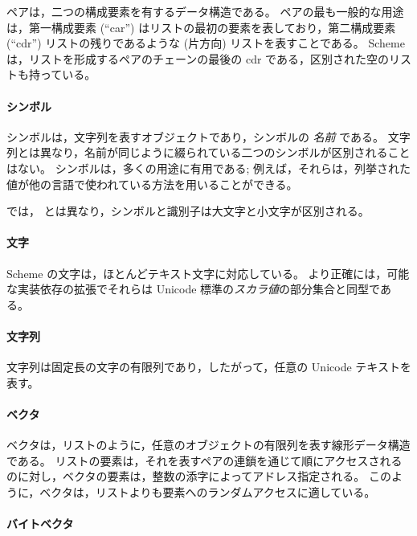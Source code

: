ペアは，二つの構成要素を有するデータ構造である。
ペアの最も一般的な用途は，第一構成要素 (``car'') はリストの最初の要素を表しており，第二構成要素 (``cdr'') リストの残りであるような (片方向) リストを表すことである。
Scheme は，リストを形成するペアのチェーンの最後の cdr である，区別された空のリストも持っている。

\paragraph{シンボル}

シンボルは，文字列を表すオブジェクトであり，シンボルの \textit{名前} である。
文字列とは異なり，名前が同じように綴られている二つのシンボルが区別されることはない。
シンボルは，多くの用途に有用である; 例えば，それらは，列挙された値が他の言語で使われている方法を用いることができる。

\rsevenrs では， \rfivers とは異なり，シンボルと識別子は大文字と小文字が区別される。

\paragraph{文字}

Scheme の文字は，ほとんどテキスト文字に対応している。
より正確には，可能な実装依存の拡張でそれらは Unicode 標準の\textit{スカラ値}の部分集合と同型である。

\paragraph{文字列}

文字列は固定長の文字の有限列であり，したがって，任意の Unicode テキストを表す。

\paragraph{ベクタ}

ベクタは，リストのように，任意のオブジェクトの有限列を表す線形データ構造である。
リストの要素は，それを表すペアの連鎖を通じて順にアクセスされるのに対し，ベクタの要素は，整数の添字によってアドレス指定される。
このように，ベクタは，リストよりも要素へのランダムアクセスに適している。

\paragraph{バイトベクタ}

